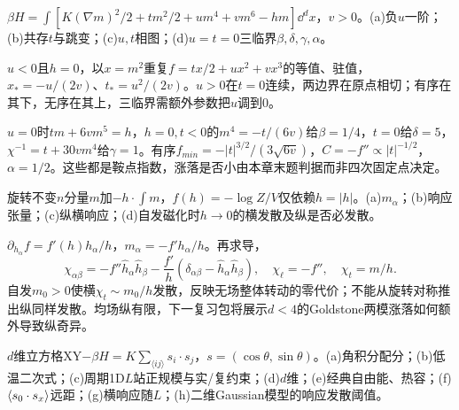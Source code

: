 \begin{exercise}[原题6(a)--(d)]\label{r:334-1-6}
$\beta H=\int[K(\nabla m)^2/2+tm^2/2+um^4+vm^6-hm]\dd^dx$，$v>0$。(a)负$u$一阶；(b)共存$t$与跳变；(c)$u,t$相图；(d)$u=t=0$三临界$\beta,\delta,\gamma,\alpha$。
\end{exercise}
\begin{solution}
$u<0$且$h=0$，以$x=m^2$重复$f=tx/2+ux^2+vx^3$的等值、驻值，$x_*=-u/(2v)$、$t_*=u^2/(2v)$。$u>0$在$t=0$连续，两边界在原点相切；有序在其下，无序在其上，三临界需额外参数把$u$调到0。

$u=0$时$tm+6vm^5=h$，$h=0,t<0$的$m^4=-t/(6v)$给$\beta=1/4$，$t=0$给$\delta=5$，$\chi^{-1}=t+30vm^4$给$\gamma=1$。有序$f_{min}=-|t|^{3/2}/(3\sqrt{6v})$，$C=-f''\propto|t|^{-1/2}$，$\alpha=1/2$。这些都是鞍点指数，涨落是否小由本章末题判据而非四次固定点决定。
\end{solution}
\begin{exercise}[原题7(a)--(d)]\label{r:334-1-7}
旋转不变$n$分量$m$加$-h\cdot\int m$，$f(h)=-\log Z/V$仅依赖$h=|h|$。(a)$m_\alpha$；(b)响应张量；(c)纵横响应；(d)自发磁化时$h\to0$的横发散及纵是否必发散。
\end{exercise}
\begin{solution}
$\partial_{h_\alpha}f=f'(h)h_\alpha/h$，$m_\alpha=-f'h_\alpha/h$。再求导，
\begin{equation}
\chi_{\alpha\beta}=-f''\hat h_\alpha\hat h_\beta-\frac{f'}h(\delta_{\alpha\beta}-\hat h_\alpha\hat h_\beta),\quad \chi_\ell=-f'',\quad\chi_t=m/h.
\end{equation}
自发$m_0>0$使横$\chi_t\sim m_0/h$发散，反映无场整体转动的零代价；不能从旋转对称推出纵同样发散。均场纵有限，下一复习包将展示$d<4$的Goldstone两模涨落如何额外导致纵奇异。
\end{solution}
\begin{exercise}[原题8(a)--(h)]\label{r:334-1-8}
$d$维立方格XY$-\beta H=K\sum_{\langle ij\rangle}s_i\cdot s_j$，$s=(\cos\theta,\sin\theta)$。(a)角积分配分；(b)低温二次式；(c)周期1D$L$站正规模与实/复约束；(d)$d$维；(e)经典自由能、热容；(f)$\langle s_0\cdot s_x\rangle$远距；(g)横响应随$L$；(h)二维Gaussian模型的响应发散阈值。
\end{exercise}
